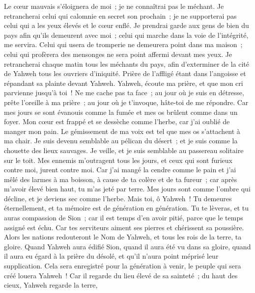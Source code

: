 \begin{multicols}{2}
Le cœur mauvais s'éloignera de moi~; je ne connaîtrai pas le méchant.
Je retrancherai celui qui calomnie en secret son prochain~; je ne supporterai pas celui qui a les yeux élevés et le cœur enflé.
Je prendrai garde aux gens de bien du pays afin qu'ils demeurent avec moi~; celui qui marche dans la voie de l'intégrité, me servira.
Celui qui usera de tromperie ne demeurera point dans ma maison~; celui qui profèrera des mensonges ne sera point affermi devant mes yeux.
Je retrancherai chaque matin tous les méchants du pays, afin d'exterminer de la cité de Yahweh tous les ouvriers d'iniquité.
\VerseOne{}Prière de l'affligé étant dans l'angoisse et répandant sa plainte devant Yahweh.
Yahweh, écoute ma prière, et que mon cri parvienne jusqu'à toi~!
Ne me cache pas ta face~; au jour où je suis en détresse, prête l'oreille à ma prière~; au jour où je t'invoque, hâte-toi de me répondre.
Car mes jours se sont évanouis comme la fumée et mes os brûlent comme dans un foyer.
Mon cœur est frappé et se dessèche comme l'herbe, car j'ai oublié de manger mon pain.
Le gémissement de ma voix est tel que mes os s'attachent à ma chair.
Je suis devenu semblable au pélican du désert~; et je suis comme la chouette des lieux sauvages.
Je veille, et je suis semblable au passereau solitaire sur le toit.
Mes ennemis m'outragent tous les jours, et ceux qui sont furieux contre moi, jurent contre moi.
Car j'ai mangé la cendre comme le pain et j'ai mêlé des larmes à ma boisson,
à cause de ta colère et de ta fureur~; car après m'avoir élevé bien haut, tu m'as jeté par terre.
Mes jours sont comme l'ombre qui décline, et je deviens sec comme l'herbe.
Mais toi, ô Yahweh~! Tu demeures éternellement, et ta mémoire est de génération en génération.
Tu te lèveras, et tu auras compassion de Sion~; car il est temps d'en avoir pitié, parce que le temps assigné est échu.
Car tes serviteurs aiment ses pierres et chérissent sa poussière.
Alors les nations redouteront le Nom de Yahweh, et tous les rois de la terre, ta gloire.
Quand Yahweh aura édifié Sion, quand il aura été vu dans sa gloire,
quand il aura eu égard à la prière du désolé, et qu'il n'aura point méprisé leur supplication.
Cela sera enregistré pour la génération à venir, le peuple qui sera créé louera Yahweh~!
Car il regarde du lieu élevé de sa sainteté~; du haut des cieux, Yahweh regarde la terre,

\end{multicols}
